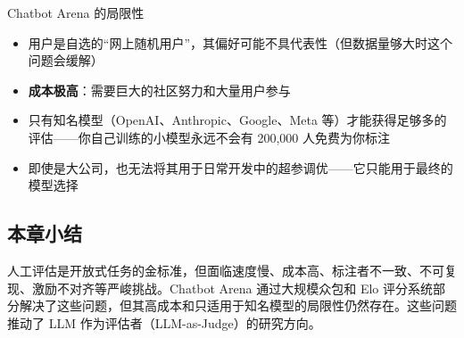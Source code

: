 \begin{warningbox}{Chatbot Arena 的局限性}
\begin{itemize}
    \item 用户是自选的``网上随机用户''，其偏好可能不具代表性（但数据量够大时这个问题会缓解）
    \item \textbf{成本极高}：需要巨大的社区努力和大量用户参与
    \item 只有知名模型（OpenAI、Anthropic、Google、Meta 等）才能获得足够多的评估——你自己训练的小模型永远不会有 200,000 人免费为你标注
    \item 即使是大公司，也无法将其用于日常开发中的超参调优——它只能用于最终的模型选择
\end{itemize}
\end{warningbox}

\subsection{本章小结}

人工评估是开放式任务的金标准，但面临速度慢、成本高、标注者不一致、不可复现、激励不对齐等严峻挑战。Chatbot Arena 通过大规模众包和 Elo 评分系统部分解决了这些问题，但其高成本和只适用于知名模型的局限性仍然存在。这些问题推动了 LLM 作为评估者（LLM-as-Judge）的研究方向。


